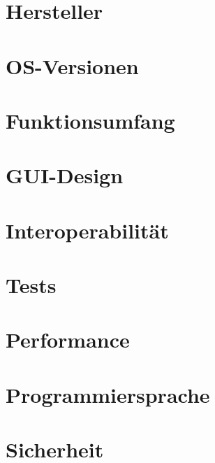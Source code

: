 \section{Hersteller}

\section{OS-Versionen}

\section{Funktionsumfang}

\section{GUI-Design}

\section{Interoperabilität}

\section{Tests}

\section{Performance}

\section{Programmiersprache}

\section{Sicherheit}
